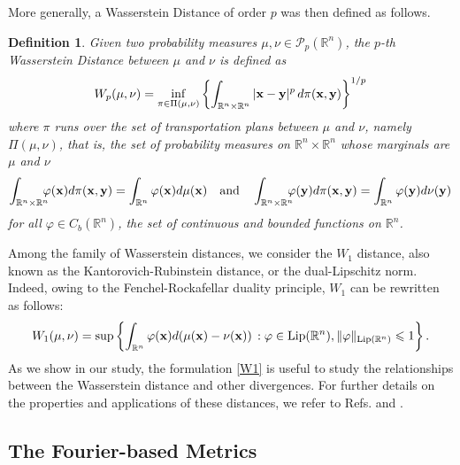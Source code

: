 \documentclass{article}
\renewcommand{\le}{\leqslant}
\newcommand{\R}{\mathbb R}
\def\R{\mathbb{R}}
\def\bx{{\bf x}}
\def\by{{\bf y}}
\newtheorem{definition}{Definition}
\begin{document}
More generally, a Wasserstein Distance of order $p$ was then defined as  follows.
% 
\begin{definition}
    Given two probability measures $\mu,\nu \in \mathcal P_p(\R^n)$, the $p$-th Wasserstein Distance between $\mu$ and $\nu$ is defined as
    \begin{equation}
    \label{Was-p}
    W_p(\mu, \nu) = \inf_{\pi \in \Pi(\mu,\nu)}\left\{ \int_{\R^n\times\R^n} |\bx-\by|^p \, d\pi(\bx,\by)\right\}^{1/p}
    \end{equation}
    where $\pi$ runs over the set of transportation plans between $\mu$ and $\nu$, namely $\Pi(\mu,\nu)$, that is, the set of probability measures on $\R^n\times\R^n$ whose marginals are $\mu$ and $\nu$
    \[
    \int_{\R^n\times\R^n}\!\!\!\! \varphi(\bx) d\pi(\bx,\by) = \int_{\R^n} \varphi(\bx) d\mu(\bx)\quad\text{and}\quad \int_{\R^n\times\R^n}\!\!\!\! \varphi(\by) d\pi(\bx,\by) = \int_{\R^n} \varphi(\by) d\nu(\by)
    \]
    for all $\varphi \in C_b(\R^n)$, the set of continuous and bounded functions on $\R^n$.
\end{definition}
% 
Among the family of Wasserstein distances, we consider the $W_1$ distance, also known as the Kantorovich-Rubinstein distance, or the dual-Lipschitz norm. 
% 
Indeed, owing to the Fenchel-Rockafellar duality principle,\cite{Vil03} $W_1$ can be rewritten as follows:
\begin{equation}
    \label{W1}
    W_1(\mu,\nu) = \sup \left\{\int_{\R^n} \varphi(\bx) d(\mu(\bx) - \nu(\bx)) \, : \varphi \in \mathrm{Lip}(\R^n), \|\varphi\|_{\mathrm{Lip}(\R^n)} \le 1 \right\}.   
\end{equation}
% 
As we show in our study, the formulation \eqref{W1} is useful to study the relationships between the Wasserstein distance and other divergences.
% 
For further details on the properties and applications of these distances, we refer to Refs. \cite{CaTo} and \cite{Vil03}.





\subsection{The Fourier-based Metrics}
\end{document}
